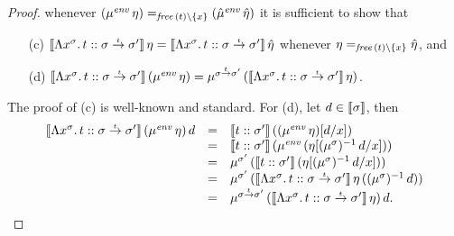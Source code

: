 \documentclass[12pt,a4paper]{report}
\newcommand{\senv}{\nstyle{env}}
\begin{document}
\begin{proof}
  whenever $(\mu^\senv\,\eta) =_{\free{t}\setminus\{x\}} (\hat{\mu}^\senv\,\hat{\eta})$
  it is sufficient to show that
  \begin{enumerate}
    \item[(c)] $\llbracket\Lambda x^\sigma.\,t\mathrel{::}\sigma\stackrel{_t}{\to}\sigma'\rrbracket\,\eta
                = \llbracket\Lambda x^\sigma.\,t\mathrel{::}\sigma\stackrel{_t}{\to}\sigma'\rrbracket\,\hat{\eta}$ whenever
               $\eta =_{\mathit{free}\,(t)\setminus\{x\}} \hat{\eta}$, and
    \item[(d)] $\semantic{\tj{\tabstr{x^\sigma}{t}}{\ttarrow{\sigma}{\sigma'}}}\,(\mu^\senv\,\eta)
                = \mu^{\ttarrow{\sigma}{\sigma'}}\,
                  (\semantic{\tj{\tabstr{x^\sigma}{t}}{\ttarrow{\sigma}{\sigma'}}}\,\eta)$.
  \end{enumerate}
  The proof of (c) is well-known and standard. For (d), let $d \in \llbracket\sigma\rrbracket$, then
  \[\begin{array}{rcl}
    \semantic{\tj{\tabstr{x^\sigma}{t}}{\ttarrow{\sigma}{\sigma'}}}\,(\mu^\senv\,\eta)\,d
    &=& \semantic{\tj{t}{\sigma'}}\,((\mu^\senv\,\eta)[d/x]) \\
    &=& \semantic{\tj{t}{\sigma'}}\,(\mu^\senv\,(\eta[(\mu^\sigma)^{-1}\,d/x])) \\
    &=& \mu^{\sigma'}\,(\semantic{\tj{t}{\sigma'}}\,(\eta[(\mu^\sigma)^{-1}\,d/x])) \\
    &=& \mu^{\sigma'}\,(\semantic{\tj{\tabstr{x^\sigma}{t}}{\ttarrow{\sigma}{\sigma'}}}\,\eta\,
          ((\mu^\sigma)^{-1}\,d)) \\
    &=& \mu^{\ttarrow{\sigma}{\sigma'}}\,(\semantic{\tj{\tabstr{x^\sigma}{t}}{\ttarrow{\sigma}{\sigma'}}}\,\eta)\,d.
  \end{array}\]
\end{proof}
\end{document}
